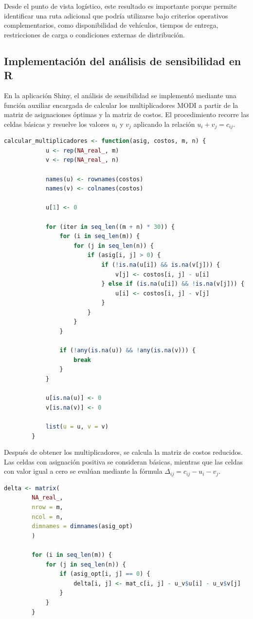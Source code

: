 \documentclass{article}
\begin{document}
	Desde el punto de vista logístico, este resultado es importante porque permite identificar
	una ruta adicional que podría utilizarse bajo criterios operativos complementarios, como
	disponibilidad de vehículos, tiempos de entrega, restricciones de carga o condiciones
	externas de distribución.
	
	\subsection{Implementación del análisis de sensibilidad en R}
	
	En la aplicación Shiny, el análisis de sensibilidad se implementó mediante una función
	auxiliar encargada de calcular los multiplicadores MODI a partir de la matriz de
	asignaciones óptimas y la matriz de costos. El procedimiento recorre las celdas básicas y
	resuelve los valores $u_i$ y $v_j$ aplicando la relación $u_i+v_j=c_{ij}$.
	
	\begin{lstlisting}[language=R, caption={Funcion para calcular multiplicadores MODI}]
		calcular_multiplicadores <- function(asig, costos, m, n) {
			u <- rep(NA_real_, m)
			v <- rep(NA_real_, n)
			
			names(u) <- rownames(costos)
			names(v) <- colnames(costos)
			
			u[1] <- 0
			
			for (iter in seq_len((m + n) * 30)) {
				for (i in seq_len(m)) {
					for (j in seq_len(n)) {
						if (asig[i, j] > 0) {
							if (!is.na(u[i]) && is.na(v[j])) {
								v[j] <- costos[i, j] - u[i]
							} else if (is.na(u[i]) && !is.na(v[j])) {
								u[i] <- costos[i, j] - v[j]
							}
						}
					}
				}
				
				if (!any(is.na(u)) && !any(is.na(v))) {
					break
				}
			}
			
			u[is.na(u)] <- 0
			v[is.na(v)] <- 0
			
			list(u = u, v = v)
		}
	\end{lstlisting}
	
	Después de obtener los multiplicadores, se calcula la matriz de costos reducidos. Las
	celdas con asignación positiva se consideran básicas, mientras que las celdas con valor
	igual a cero se evalúan mediante la fórmula $\Delta_{ij}=c_{ij}-u_i-v_j$.
	
	\begin{lstlisting}[language=R, caption={Calculo de costos reducidos}]
		delta <- matrix(
		NA_real_,
		nrow = m,
		ncol = n,
		dimnames = dimnames(asig_opt)
		)
		
		for (i in seq_len(m)) {
			for (j in seq_len(n)) {
				if (asig_opt[i, j] == 0) {
					delta[i, j] <- mat_c[i, j] - u_v$u[i] - u_v$v[j]
				}
			}
		}
	\end{lstlisting}
	
\end{document}
